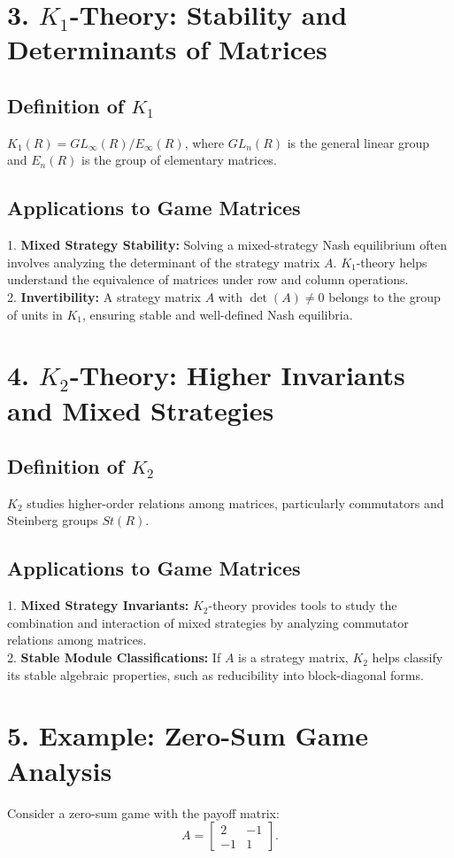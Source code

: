 \documentclass[12pt]{article}
\begin{document}
\section*{3. \( K_1 \)-Theory: Stability and Determinants of Matrices}
\subsection*{Definition of \( K_1 \)}
\( K_1(R) = GL_\infty(R)/E_\infty(R) \), where \( GL_n(R) \) is 
the general linear group and \( E_n(R) \) is the group of elementary matrices.

\subsection*{Applications to Game Matrices}
1. \textbf{Mixed Strategy Stability:} Solving a mixed-strategy 
Nash equilibrium often involves analyzing the determinant of 
the strategy matrix \( A \). \( K_1 \)-theory helps understand
 the equivalence of matrices under row and column operations.\\
2. \textbf{Invertibility:} A strategy matrix \( A \) 
with \( \det(A) \neq 0 \) belongs to the group of units in \( K_1 \), 
ensuring stable and well-defined Nash equilibria.

\section*{4. \( K_2 \)-Theory: Higher Invariants and Mixed Strategies}
\subsection*{Definition of \( K_2 \)}
\( K_2 \) studies higher-order relations among matrices, 
particularly commutators and Steinberg groups \( St(R) \).

\subsection*{Applications to Game Matrices}
1. \textbf{Mixed Strategy Invariants:} \( K_2 \)-theory provides tools to
 study the combination and interaction of mixed strategies by
  analyzing commutator relations among matrices.\\
2. \textbf{Stable Module Classifications:} If \( A \) is a strategy matrix,
 \( K_2 \) helps classify its stable algebraic properties,
  such as reducibility into block-diagonal forms.

\section*{5. Example: Zero-Sum Game Analysis}
Consider a zero-sum game with the payoff matrix:
\[
A = \begin{bmatrix}
2 & -1 \\
-1 & 1
\end{bmatrix}.
\]
\end{document}
